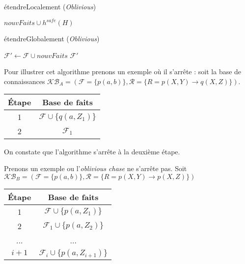 \begin{algorithm}[H]\label{algo:etendre_local_oblivious}
\caption{étendreLocalement (\textit{Oblivious})}
\SetAlgoLined
\DontPrintSemicolon
{}
    \Return $nouvFaits \cup h^{safe}(H)$ 
\end{algorithm}

\begin{algorithm}[H]\label{algo:etendre_global_oblivious}
\caption{étendreGlobalement (\textit{Oblivious})}
\SetAlgoLined
\DontPrintSemicolon
{}
    $\mathcal{F'} \gets \mathcal{F} \cup nouvFaits$\;
    \Return $\mathcal{F'}$
\end{algorithm}

Pour illustrer cet algorithme prenons un exemple où il s'arrête : soit la base de connaissances $\mathcal{KB}_A = (\mathcal{F} = \{p(a,b)\}, \mathcal{R} = \{R = p(X,Y) \rightarrow q(X,Z) \})$.
\begin{center}
\begin{tabular}{|c|c|}
    \hline
    Étape & Base de faits  \\ 
    \hline
    1 &$\mathcal{F} \cup \{q(a, Z_1)\}$ \\ 
    \hline
    2 &$\mathcal{F}_1$  \\
    \hline
\end{tabular}
\end{center}
On constate que l'algorithme s'arrête à la deuxième étape.
\par Prenons un exemple ou l'\textit{oblivious chase} ne s'arrête pas. Soit
$\mathcal{KB}_B = (\mathcal{F} = \{p(a,b)\}, \mathcal{R} = \{R = p(X,Y) \rightarrow p(X,Z) \})$

\begin{center}
\begin{tabular}{|c|c|}
    \hline
    Étape & Base de faits  \\ 
    \hline
    1 &$\mathcal{F} \cup \{p(a, Z_1)\}$ \\ 
    \hline
    2 &$\mathcal{F}_1 \cup \{p(a, Z_2)\}$ \\
    \hline
    ... & ... \\
    \hline
    $i+1$ & $\mathcal{F}_i \cup \{p(a, Z_{i+1})\} $ \\
    \hline
\end{tabular}
\end{center}

